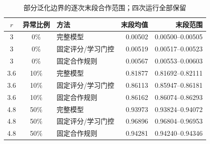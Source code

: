 \begin{table}[!htbp]
\centering\small
\caption{部分泛化边界的逐次末段合作范围；四次运行全部保留}
\label{tab:w2-parameter-boundaries}
\begin{tabular}{cclrr}
\toprule
$r$ & 异常比例 & 方法 & 末段均值 & 末段范围 \\
\midrule
3 & 0\% & 完整模型 & 0.00502 & 0.00500--0.00505 \\
3 & 0\% & 固定评分/学习门控 & 0.00519 & 0.00517--0.00523 \\
3 & 0\% & 固定合作规则 & 0.00567 & 0.00553--0.00603 \\
3.6 & 10\% & 完整模型 & 0.81877 & 0.81692--0.82111 \\
3.6 & 10\% & 固定评分/学习门控 & 0.86113 & 0.85947--0.86181 \\
3.6 & 10\% & 固定合作规则 & 0.86162 & 0.86074--0.86293 \\
4.8 & 50\% & 完整模型 & 0.93973 & 0.93824--0.94072 \\
4.8 & 50\% & 固定评分/学习门控 & 0.96896 & 0.96804--0.96953 \\
4.8 & 50\% & 固定合作规则 & 0.94281 & 0.94240--0.94346 \\
\bottomrule
\end{tabular}
\par{}
\end{table}
